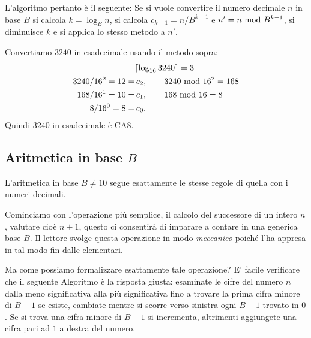 L'algoritmo pertanto è il seguente:  Se si vuole convertire il numero decimale $n$ in base $B$ si calcola $k = \log_B n$, si calcola $c_{k-1} = n / B^{k-1}$ e $n' = n \ \text{mod}\ B^{k-1}$, si diminuisce $k$ e si applica lo stesso metodo a $n'$.

\begin{ex}
Convertiamo $3240$ in esadecimale usando il metodo sopra:
\begin{align*}
  &\lceil \log_{16} 3240 \rceil = 3\\
  3240 / 16^2 = 12 = &\, c_2, \qquad 3240 \ \text{mod}\ 16^2 = 168\\
  168 / 16^1 = 10 = &\, c_1,  \qquad 168 \ \text{mod}\ 16 = 8\\
  8 / 16^0 = 8 = &\, c_0.
\end{align*}
Quindi $3240$ in esadecimale è $\mathrm{CA}8$.
\end{ex}

\subsection{Aritmetica in base $B$}

L'aritmetica in base $B\neq 10$ segue esattamente le stesse regole di quella con i numeri decimali.

Cominciamo con l'operazione più semplice, il calcolo del successore di un intero $n$, valutare cioè $n+1$, questo ci consentirà di imparare a contare in una generica base $B$. Il lettore svolge questa operazione in modo \emph{meccanico} poiché l'ha appresa in tal modo fin dalle elementari.

Ma come possiamo formalizzare esattamente tale operazione? E' facile verificare che il seguente Algoritmo è la risposta giusta:
esaminate le cifre del numero $n$ dalla meno significativa alla più
significativa fino a trovare la prima cifra minore di $B-1$ se esiste, cambiate
mentre si scorre verso sinistra ogni $B-1$ trovato in $0$. Se si trova una
cifra minore di $B-1$ si incrementa, altrimenti aggiungete una cifra pari ad
$1$ a destra del numero.

